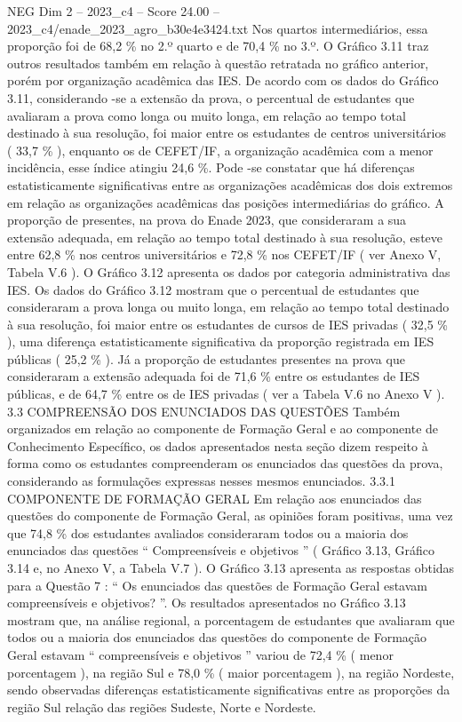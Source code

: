\begin{textsample}{NEG Dim 2 – 2023\_c4 – Score 24.00 – 2023\_c4/enade\_2023\_agro\_b30e4e3424.txt}
Nos quartos intermediários, essa proporção foi de 68,2 \% no 2.º quarto e de 70,4 \% no 3.º.
O Gráfico 3.11 traz outros resultados também em relação à questão retratada no gráfico anterior, porém por organização acadêmica das IES.
De acordo com os dados do Gráfico 3.11, considerando -se a extensão da prova, o percentual de estudantes que avaliaram a prova como longa ou muito longa, em relação ao tempo total destinado à sua resolução, foi maior entre os estudantes de centros universitários ( 33,7 \% ), enquanto os de CEFET/IF, a organização acadêmica com a menor incidência, esse índice atingiu 24,6 \%.
Pode -se constatar que há diferenças estatisticamente significativas entre as organizações acadêmicas dos dois extremos em relação as organizações acadêmicas das posições intermediárias do gráfico.
A proporção de presentes, na prova do Enade 2023, que consideraram a sua extensão adequada, em relação ao tempo total destinado à sua resolução, esteve entre 62,8 \% nos centros universitários e 72,8 \% nos CEFET/IF ( ver Anexo V, Tabela V.6 ).
O Gráfico 3.12 apresenta os dados por categoria administrativa das IES.
Os dados do Gráfico 3.12 mostram que o percentual de estudantes que consideraram a prova longa ou muito longa, em relação ao tempo total destinado à sua resolução, foi maior entre os estudantes de cursos de IES privadas ( 32,5 \% ), uma diferença estatisticamente significativa da proporção registrada em IES públicas ( 25,2 \% ).
Já a proporção de estudantes presentes na prova que consideraram a extensão adequada foi de 71,6 \% entre os estudantes de IES públicas, e de 64,7 \% entre os de IES privadas ( ver a Tabela V.6 no Anexo V ). 3.3 COMPREENSÃO DOS ENUNCIADOS DAS QUESTÕES Também organizados em relação ao componente de Formação Geral e ao componente de Conhecimento Específico, os dados apresentados nesta seção dizem respeito à forma como os estudantes compreenderam os enunciados das questões da prova, considerando as formulações expressas nesses mesmos enunciados. 3.3.1 COMPONENTE DE FORMAÇÃO GERAL Em relação aos enunciados das questões do componente de Formação Geral, as opiniões foram positivas, uma vez que 74,8 \% dos estudantes avaliados consideraram todos ou a maioria dos enunciados das questões “ Compreensíveis e objetivos ” ( Gráfico 3.13, Gráfico 3.14 e, no Anexo V, a Tabela V.7 ).
O Gráfico 3.13 apresenta as respostas obtidas para a Questão 7 : “ Os enunciados das questões de Formação Geral estavam compreensíveis e objetivos? ”.
Os resultados apresentados no Gráfico 3.13 mostram que, na análise regional, a porcentagem de estudantes que avaliaram que todos ou a maioria dos enunciados das questões do componente de Formação Geral estavam “ compreensíveis e objetivos ” variou de 72,4 \% ( menor porcentagem ), na região Sul e 78,0 \% ( maior porcentagem ), na região Nordeste, sendo observadas diferenças estatisticamente significativas entre as proporções da região Sul relação das regiões Sudeste, Norte e Nordeste.

\end{textsample}
